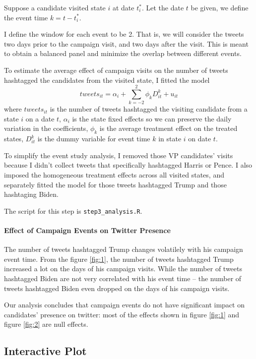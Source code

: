 \documentclass{article}
\begin{document}
	Suppose a candidate visited state $i$ at date $t_i^*$. Let the date $t$ be given, we define the event time $k = t - t_i^*$. 
	
	I define the window for each event to be 2. That is, we will consider the tweets two days prior to the campaign visit, and two days after the visit. This is meant to obtain a balanced panel and minimize the overlap between different events.  

To estimate the average effect of campaign visits on the number of tweets hashtagged the candidates from the visited state, I fitted the model
\begin{equation} \label{eqn:1}
	tweets_{it}=\alpha_{i} +\sum_{k=-2}^{2} \phi_{k} D_{i t}^{k}+u_{i t}
\end{equation}
where $tweets_{it}$ is the number of tweets hashtagged the visiting candidate from a state $i$ on a date $t$, $\alpha_i$ is the state fixed effects so we can preserve the daily variation in the coefficients, $\phi_k$ is the average treatment effect on the treated states, $D_{it}^k$ is the dummy variable for event time $k$ in state $i$ on date $t$. 

To simplify the event study analysis, I removed those VP candidates' visits because I didn't collect tweets that specifically hashtagged Harris or Pence. I also imposed the homogeneous treatment effects across all visited states, and separately fitted the model for those tweets hashtagged Trump and those hashtaging Biden. 

The script for this step is \verb|step3_analysis.R|.

\paragraph{Effect of Campaign Events on Twitter Presence}
The number of tweets hashtagged Trump changes volatilely with his campaign event time. From the figure \ref{fig:1}, the number of tweets hashtagged Trump increased a lot on the days of his campaign visits. While the number of tweets hashtagged Biden are not very correlated with his event time -- the number of tweets hashtagged Biden even dropped on the days of his campaign visits. 

Our analysis concludes that campaign events do not have significant impact on candidates' presence on twitter: most of the effects shown in figure \ref{fig:1} and figure \ref{fig:2} are null effects.

\subsection{Interactive Plot}
\end{document}
